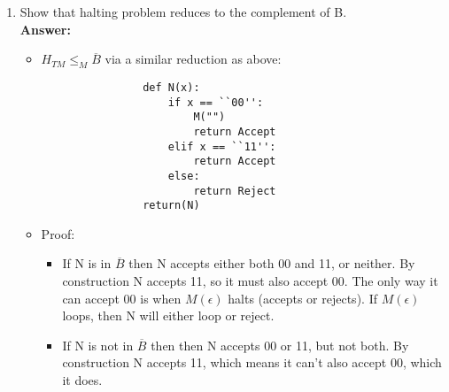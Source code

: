 \documentclass[12pt]{article}
\begin{document}
\begin{enumerate}
\begin{enumerate}
\begin{itemize}
			\end{itemize}

		\item Show that halting problem reduces to the complement of B.
			\\[.2in]\textbf{Answer:}
			\begin{itemize}
			\item  $H_{TM} \leq_{M}\overline{B}$ via a similar reduction as above:
			\begin{lstlisting}
				def N(x):
					if x == ``00'':
						M("")
						return Accept 
					elif x == ``11'':
						return Accept
					else:
						return Reject
				return(N)
			\end{lstlisting}
			\item Proof:
			\begin{itemize}
				\item If N is in $\overline{B}$ then N accepts either both 00 and 11, or neither.  By construction N accepts 11, so it must also accept 00.  The only way it can accept 00 is when $M(\epsilon)$ halts (accepts or rejects). If $M(\epsilon)$ loops, then N will either loop or reject.
				\item If N is not in $\overline{B}$ then then N accepts 00 or 11, but not both. By construction N accepts 11, which means it can't also accept 00, which it does. 
			\end{itemize}


\end{itemize}
\end{enumerate}
\end{enumerate}
\end{document}
